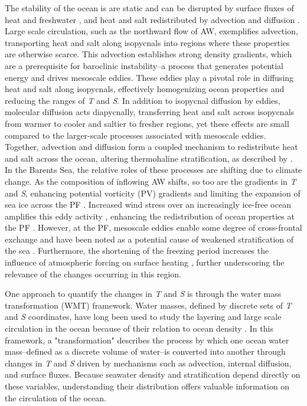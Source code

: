 \documentclass[draft]{agujournal2019}
\begin{document}
The stability of the ocean is are static and can be disrupted by surface fluxes of heat and freshwater \cite{Speer1993}, and heat and salt redistributed by advection and diffusion \cite{StoleHansen1991,long2017}. Large scale circulation, such as the northward flow of AW, exemplifies advection, transporting heat and salt along isopycnals into regions where these properties are otherwise scarce. This advection establishes strong density gradients, which are a prerequisite for baroclinic instability--a process that generates potential energy and drives mesoscale eddies. These eddies play a pivotal role in diffusing heat and salt along isopycnals, effectively homogenizing ocean properties and reducing the ranges of \emph{T} and \emph{S}. In addition to isopycnal diffusion by eddies, molecular diffusion acts diapycnally, transferring heat and salt across isopycnals from warmer to cooler and saltier to fresher regions, yet these effects are small compared to the larger-scale processes associated with mesoscale eddies. Together, advection and diffusion form a coupled mechanism to redistribute heat and salt across the ocean, altering thermohaline stratification, as described by . In the Barents Sea, the relative roles of these processes are shifting due to climate change. As the composition of inflowing AW shifts, so too are the gradients in \emph{T} and \emph{S}, enhancing potential vorticity (PV) gradients and limiting the expansion of sea ice across the PF \cite{Oziel2016,Barton18}. Increased wind stress over an increasingly ice-free ocean amplifies this eddy activity \cite{Shao2023,li2024eddy}, enhancing the redistribution of ocean properties at the PF \cite{Porter2020}. However, at the PF, mesoscale eddies enable some degree of cross-frontal exchange and have been noted as a potential cause of weakened stratification of the sea \cite{kolas2024}. Furthermore, the shortening of the freezing period increases the influence of atmospheric forcing on surface heating \cite{Dorr2024}, further underscoring the relevance of the changes occurring in this region. 


One approach to quantify the changes in \emph{T} and \emph{S} is through the water mass transformation (WMT) framework. Water masses, defined by discrete sets of \emph{T} and \emph{S} coordinates, have long been used to study the layering and large scale circulation in the ocean because of their relation to ocean density \cite{sverdrup1942}. In this framework, a "transformation" describes the process by which one ocean water mass--defined as a discrete volume of water--is converted into another through changes in \emph{T} and \emph{S} driven by mechanisms such as advection, internal diffusion, and surface fluxes. Because seawater density and stratification depend directly on these variables, understanding their distribution offers  valuable information on the circulation of the ocean.
\end{document}
